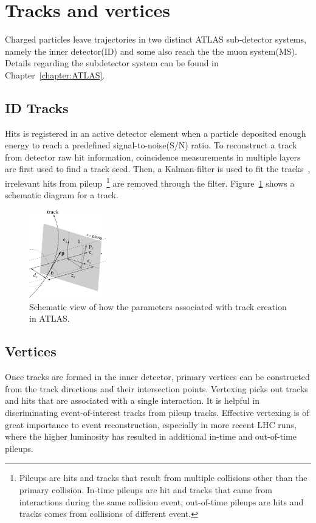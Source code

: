 \section{Tracks and vertices}
\label{sec:Tracks}
Charged particles leave trajectories in two distinct ATLAS sub-detector systems, namely the inner detector(ID) and some also reach the the muon system(MS). Details regarding the subdetector system can be found in Chapter~\ref{chapter:ATLAS}.

\subsection{ID Tracks}
Hits is registered in an active detector element when a particle deposited enough energy to reach a predefined signal-to-noise(S/N) ratio. To reconstruct a track from detector raw hit information, coincidence measurements in multiple layers are first used to find a track seed. Then, a Kalman-filter is used to fit the tracks~\cite{track}, irrelevant hits from pileup~\footnote{Pileups are hits and tracks that result from multiple collisions other than the primary collision. In-time pileups are hit and tracks that came from interactions during the same collision event, out-of-time pileups are hits and tracks
comes from collisions of different event.} are removed through the filter. Figure~\ref{fig:track} shows a schematic diagram for a track.

\begin{figure}[!htb]
    \begin{center}
        \includegraphics[width=0.3\textwidth]{figures/common_ana/Track}
        \caption{ 
        Schematic view of how the parameters associated with track creation in ATLAS.
        }
        \label{fig:track}
    \end{center}
\end{figure}

\subsection{Vertices}
Once tracks are formed in the inner detector, primary vertices can be constructed from the track directions and their intersection points. Vertexing picks out tracks and hits that are associated with a single interaction. It is helpful in discriminating event-of-interest tracks from pileup tracks. Effective vertexing is of great importance to event reconstruction, especially in more recent LHC runs, where the higher luminosity has resulted in additional in-time and out-of-time pileups.

